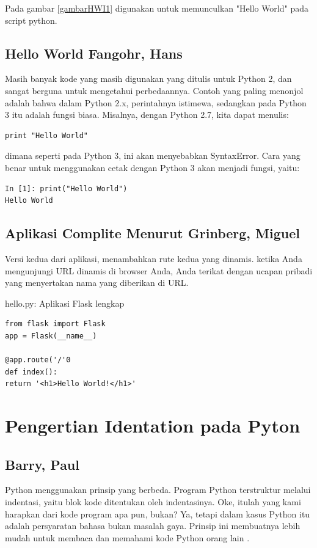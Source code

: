 \documentclass[12pt]{article}
\begin{document}
Pada gambar \ref{gambarHWI1} digunakan untuk memunculkan "Hello World" pada script python\cite{parra2017scripting}.

\subsection{Hello World Fangohr, Hans}
Masih banyak kode yang masih digunakan yang ditulis untuk Python 2, dan sangat berguna untuk mengetahui perbedaannya. Contoh yang paling menonjol adalah bahwa dalam Python 2.x, perintahnya istimewa, sedangkan pada Python 3 itu adalah fungsi biasa. Misalnya, dengan Python 2.7, kita dapat menulis:
\begin{verbatim}
print "Hello World"
\end{verbatim}
dimana seperti pada Python 3, ini akan menyebabkan SyntaxError. Cara yang benar untuk menggunakan cetak dengan Python 3 akan menjadi fungsi, yaitu:
\begin{verbatim}
In [1]: print("Hello World")
Hello World
\end{verbatim}
\cite{fangohr2015python}

\subsection{Aplikasi Complite Menurut Grinberg, Miguel}
Versi kedua dari aplikasi, menambahkan rute kedua yang dinamis. ketika Anda mengunjungi URL dinamis di browser Anda, Anda terikat dengan ucapan pribadi yang menyertakan nama yang diberikan di URL.

hello.py: Aplikasi Flask lengkap
\begin{verbatim}
from flask import Flask
app = Flask(__name__)

@app.route('/'0
def index():
return '<h1>Hello World!</h1>'
\end{verbatim}
\cite{grinberg2018flask}
 
\section{Pengertian Identation pada Pyton}

\subsection{Barry, Paul}
Python menggunakan prinsip yang berbeda. Program Python terstruktur melalui indentasi, yaitu blok kode ditentukan oleh indentasinya. Oke, itulah yang kami harapkan dari kode program apa pun, bukan? Ya, tetapi dalam kasus Python itu adalah persyaratan bahasa bukan masalah gaya. Prinsip ini membuatnya lebih mudah untuk membaca dan memahami kode Python orang lain \cite{barry2016head}.
\end{document}
